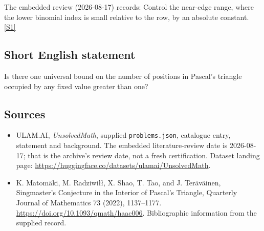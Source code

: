 \documentclass[11pt,a4paper]{article}
\newcommand{\sref}[2]{\hyperlink{source:#1:#2}{[S#2]}}
\begin{document}
The embedded review (2026-08-17) records: Control the near-edge range, where the lower binomial index is small relative to the row, by an absolute constant. \sref{statement}{1}

\subsection{Short English statement}

Is there one universal bound on the number of positions in Pascal’s triangle occupied by any fixed value greater than one?

\subsection{Sources}

{\small

\begin{itemize}

\item[\hypertarget{source:statement:1}{S1}] ULAM.AI, \emph{UnsolvedMath}, supplied \texttt{problems.json}, catalogue entry, statement and background. The embedded literature-review date is 2026-08-17; that is the archive’s review date, not a fresh certification. Dataset landing page: \url{https://huggingface.co/datasets/ulamai/UnsolvedMath}.

\item[\hypertarget{source:statement:2}{S2}] K. Matomäki, M. Radziwiłł, X. Shao, T. Tao, and J. Teräväinen, Singmaster's Conjecture in the Interior of Pascal's Triangle, Quarterly Journal of Mathematics 73 (2022), 1137–1177. \url{https://doi.org/10.1093/qmath/haac006}. Bibliographic information from the supplied record.

\end{itemize}

}

\label{end:statement}
\end{document}
